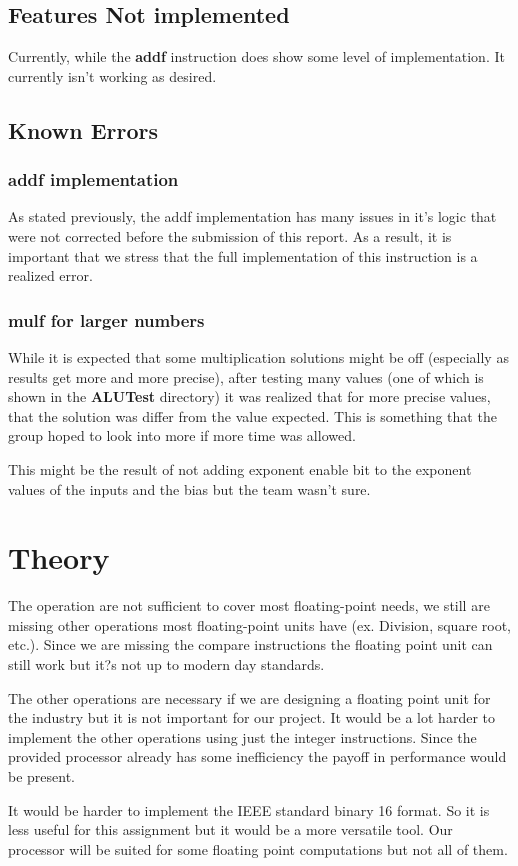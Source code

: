 \documentclass[conference]{IEEEtran}
\begin{document}
\subsection{Features Not implemented}
Currently, while the \textbf{addf} instruction does show some level of implementation. It currently isn't 
working as desired. 



\subsection{Known Errors}
\subsubsection{addf implementation}
As stated previously, the addf implementation has many issues in it's logic that were not corrected before
the submission of this report. As a result, it is important that we stress that the full implementation of 
this instruction is a realized error. 

\subsubsection{mulf for larger numbers}
While it is expected that some multiplication solutions might be off (especially as results get more and 
more precise), after testing many values (one of which is shown in the \textbf{ALUTest} directory) it was 
realized that for more precise values, that the solution was differ from the value expected. This is 
something that the group hoped to look into more if more time was allowed. 

This might be the result of not adding exponent enable bit to the exponent values of the inputs and the
 bias but the team wasn't sure. 


\section{Theory}
The operation are not sufficient to cover most floating-point needs, we still are missing other operations
most floating-point units have (ex. Division, square root, etc.). Since we are missing the compare
instructions the floating point unit can still work but it?s not up to modern day standards.

The other operations are necessary if we are designing a floating point unit for the industry but it is not
important for our project. It would be a lot harder to implement the other operations using just
the integer instructions. Since the provided processor already has some inefficiency the payoff in performance would be present.

It would be harder to implement the IEEE standard binary 16 format. So it is less useful for this assignment
 but it would be a more versatile tool. Our processor will be suited for some floating point computations but
 not all of them.

\end{document}

